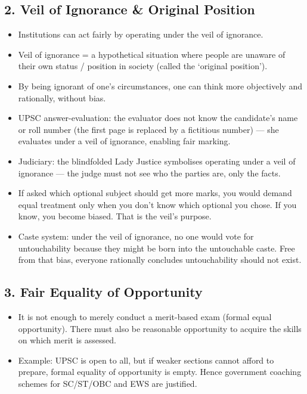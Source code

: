\subsection*{2. Veil of Ignorance \& Original Position}
\begin{KeyConcept}
\begin{itemize}
\item Institutions can act fairly by operating under the veil of ignorance.
\item Veil of ignorance = a hypothetical situation where people are unaware of their own status / position in society (called the `original position').
\item By being ignorant of one's circumstances, one can think more objectively and rationally, without bias.
\end{itemize}
\end{KeyConcept}

\begin{ExampleBox}
\begin{itemize}
\item UPSC answer-evaluation: the evaluator does not know the candidate's name or roll number (the first page is replaced by a fictitious number) --- she evaluates under a veil of ignorance, enabling fair marking.
\item Judiciary: the blindfolded Lady Justice symbolises operating under a veil of ignorance --- the judge must not see who the parties are, only the facts.
\item If asked which optional subject should get more marks, you would demand equal treatment only when you don't know which optional you chose. If you know, you become biased. That is the veil's purpose.
\item Caste system: under the veil of ignorance, no one would vote for untouchability because they might be born into the untouchable caste. Free from that bias, everyone rationally concludes untouchability should not exist.
\end{itemize}
\end{ExampleBox}

\subsection*{3. Fair Equality of Opportunity}
\begin{itemize}
\item It is not enough to merely conduct a merit-based exam (formal equal opportunity). There must also be reasonable opportunity to acquire the skills on which merit is assessed.
\item Example: UPSC is open to all, but if weaker sections cannot afford to prepare, formal equality of opportunity is empty. Hence government coaching schemes for SC/ST/OBC and EWS are justified.
\end{itemize}

